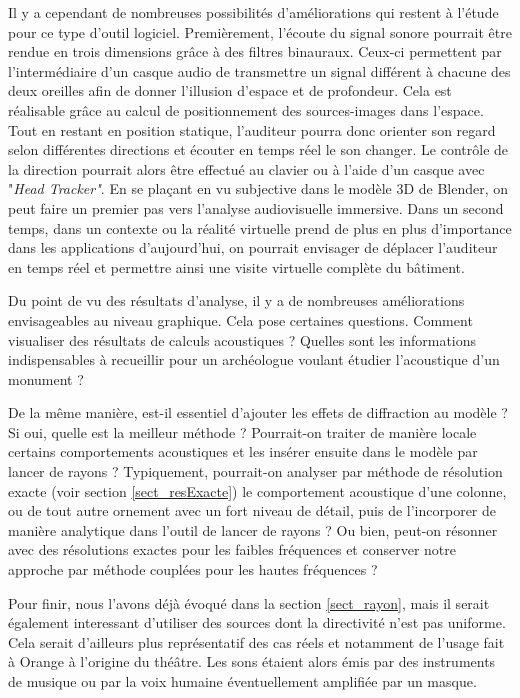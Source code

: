 Il y a cependant de nombreuses possibilités d'améliorations qui restent à l'étude pour ce type d'outil logiciel. Premièrement, l'écoute du signal sonore pourrait être rendue en trois dimensions grâce à des filtres binauraux. Ceux-ci permettent par l'intermédiaire d'un casque audio de transmettre un signal différent à chacune des deux oreilles afin de donner l'illusion d'espace et de profondeur. Cela est réalisable grâce au calcul de positionnement des sources-images dans l'espace. Tout en restant en position statique, l'auditeur pourra donc orienter son regard selon différentes directions et écouter en temps réel le son changer. Le contrôle de la direction pourrait alors être effectué au clavier ou à l'aide d'un casque avec "\textit{Head Tracker"}. En se plaçant en vu subjective dans le modèle 3D de Blender, on peut faire un premier pas vers l'analyse audiovisuelle immersive. Dans un second temps, dans un contexte ou la réalité virtuelle prend de plus en plus d'importance dans les applications d'aujourd'hui, on pourrait envisager de déplacer l'auditeur en temps réel et permettre ainsi une visite virtuelle complète du bâtiment.


Du point de vu des résultats d'analyse, il y a de nombreuses améliorations envisageables au niveau graphique. Cela pose certaines questions. Comment visualiser des résultats de calculs acoustiques ? Quelles sont les informations indispensables à recueillir pour un archéologue voulant étudier l'acoustique d'un monument ? 

De la même manière, est-il essentiel d'ajouter les effets de diffraction au modèle ? Si oui, quelle est la meilleur méthode ? Pourrait-on traiter de manière locale certains comportements acoustiques et les insérer ensuite dans le modèle par lancer de rayons ? Typiquement, pourrait-on analyser par méthode de résolution exacte (voir section \ref{sect_resExacte}) le comportement acoustique d'une colonne, ou de tout autre ornement avec un fort niveau de détail, puis de l'incorporer de manière analytique dans l'outil de lancer de rayons ? Ou bien, peut-on résonner avec des résolutions exactes pour les faibles fréquences et conserver notre approche par méthode couplées pour les hautes fréquences ?

Pour finir, nous l'avons déjà évoqué dans la section \ref{sect_rayon}, mais il serait également interessant d'utiliser des sources dont la directivité n'est pas uniforme. Cela serait d'ailleurs plus représentatif des cas réels et notamment de l'usage fait à Orange à l'origine du théâtre. Les sons étaient alors émis par des instruments de musique ou par la voix humaine éventuellement amplifiée par un masque.




\newpage
	
 
 
